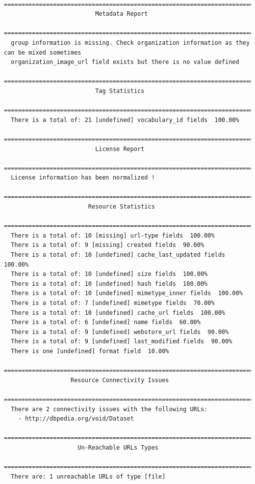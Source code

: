 \documentclass[runningheads,a4paper]{llncs}
\begin{document}
\begin{lstlisting}
 =======================================================================
                          Metadata Report
 =======================================================================
  group information is missing. Check organization information as they can be mixed sometimes
  organization_image_url field exists but there is no value defined
 =======================================================================
                          Tag Statistics
 =======================================================================
  There is a total of: 21 [undefined] vocabulary_id fields  100.00%
 =======================================================================
                          License Report
 =======================================================================
  License information has been normalized !
 =======================================================================
                        Resource Statistics
 =======================================================================
  There is a total of: 10 [missing] url-type fields  100.00%
  There is a total of: 9 [missing] created fields  90.00%
  There is a total of: 10 [undefined] cache_last_updated fields  100.00%
  There is a total of: 10 [undefined] size fields  100.00%
  There is a total of: 10 [undefined] hash fields  100.00%
  There is a total of: 10 [undefined] mimetype_inner fields  100.00%
  There is a total of: 7 [undefined] mimetype fields  70.00%
  There is a total of: 10 [undefined] cache_url fields  100.00%
  There is a total of: 6 [undefined] name fields  60.00%
  There is a total of: 9 [undefined] webstore_url fields  90.00%
  There is a total of: 9 [undefined] last_modified fields  90.00%
  There is one [undefined] format field  10.00%
 =======================================================================
                   Resource Connectivity Issues
 =======================================================================
  There are 2 connectivity issues with the following URLs:
    - http://dbpedia.org/void/Dataset
 =======================================================================
                     Un-Reachable URLs Types
 =======================================================================
  There are: 1 unreachable URLs of type [file]
\end{lstlisting}
\end{document}
